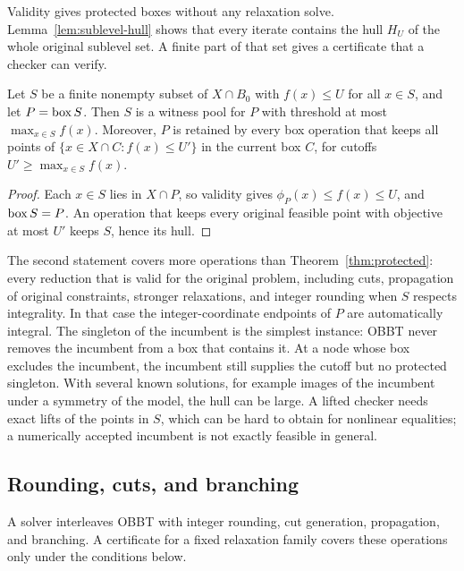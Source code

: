 Validity gives protected boxes without any relaxation solve.
Lemma~\ref{lem:sublevel-hull} shows that every iterate contains the hull
$H_U$ of the whole original sublevel set. A finite part of that set gives
a certificate that a checker can verify.

\begin{corollary}\label{cor:original-points}
Let $S$ be a finite nonempty subset of $X\cap B_0$ with $f(x)\le U$ for
all $x\in S$, and let $P=\operatorname{box} S$. Then $S$ is a witness pool for $P$
with threshold at most $\max_{x\in S}f(x)$. Moreover, $P$ is retained by
every box operation that keeps all points of
$\{x\in X\cap C:f(x)\le U'\}$ in the current box $C$, for cutoffs
$U'\ge\max_{x\in S}f(x)$.
\end{corollary}
\begin{proof}
Each $x\in S$ lies in $X\cap P$, so validity gives $\phi_P(x)\le f(x)\le
U$, and $\operatorname{box} S=P$. An operation that keeps every original feasible
point with objective at most $U'$ keeps $S$, hence its hull.
\end{proof}

The second statement covers more operations than
Theorem~\ref{thm:protected}: every reduction that is valid for the
original problem, including cuts, propagation of original constraints,
stronger relaxations, and integer rounding when $S$ respects integrality.
In that case the integer-coordinate endpoints of $P$ are automatically
integral. The singleton of the incumbent is the simplest instance: OBBT
never removes the incumbent from a box that contains it. At a node whose
box excludes the incumbent, the incumbent still supplies the cutoff but
no protected singleton. With several known solutions, for example
images of the incumbent under a symmetry of the model, the hull can be
large. A lifted checker needs exact lifts of the points in $S$, which can
be hard to obtain for nonlinear equalities; a numerically accepted
incumbent is not exactly feasible in general.

\subsection{Rounding, cuts, and branching}\label{sec:cert-scope}

A solver interleaves OBBT with integer rounding, cut generation,
propagation, and branching. A certificate for a fixed relaxation family
covers these operations only under the conditions below.

